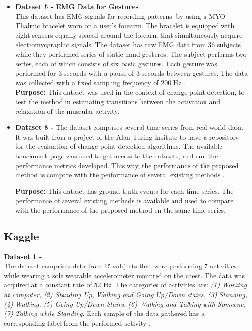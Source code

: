 \begin{itemize}
\item \textbf{Dataset 5 - EMG Data for Gestures}\\
This dataset has EMG signals for recording patterns, by using a MYO Thalmic bracelet worn on a user's forearm. The bracelet is equipped with eight sensors equally spaced around the forearm that simultaneously acquire electromyographic signals. The dataset has raw EMG data from 36 subjects while they performed series of static hand gestures. The subject performs two series, each of which consists of six basic gestures. Each gesture was performed for 3 seconds with a pause of 3 seconds between gestures. The data was collected with a fixed sampling frequency of 200 Hz \cite{dataset5}.\\
\textbf{Purpose:} This dataset was used in the context of change point detection, to test the method in estimating transitions between the activation and relaxation of the muscular activity.
    
    
    \item \textbf{Dataset 8 - } The dataset comprises several time series from real-world data. It was built from a project of the Alan Turing Insitute to have a repository for the evaluation of change point detection algorithms. The available benchmark page was used to get access to the datasets, and run the performance metrics developed. This way, the performance of the proposed method is compare with the performance of several existing methods \cite{cpd_alan}.
    \par
    \textbf{Purpose:} This dataset has ground-truth events for each time series. The performance of several existing methods is available and used to compare with the performance of the proposed method on the same time series.

\end{itemize}
    
\subsection{Kaggle}

\textbf{Dataset 1 - }\\
The dataset comprises data from 15 subjects that were performing 7 activities while wearing a sole wearable accelerometer mounted on the chest. The data was acquired at a constant rate of 52 Hz. The categories of activities are: \textit{(1) Working at computer, (2) Standing Up, Walking and Going Up/Down stairs, (3) Standing, (4) Walking, (5) Going Up/Down Stairs, (6) Walking and Talking with Someone, (7) Talking while Standing}. Each sample of the data gathered has a corresponding label from the performed activity \cite{dataset1}.\\

